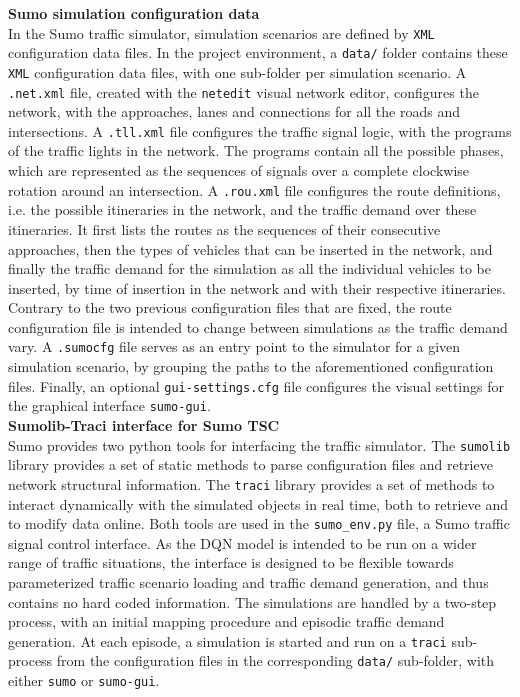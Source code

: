 \textbf{Sumo simulation configuration data} \\
In the Sumo traffic simulator, simulation scenarios are defined by \texttt{XML} configuration data files. In the project environment, a \texttt{data/} folder contains these \texttt{XML} configuration data files, with one sub-folder per simulation scenario. A \texttt{.net.xml} file, created with the \texttt{netedit} visual network editor, configures the network, with the approaches, lanes and connections for all the roads and intersections. A \texttt{.tll.xml} file configures the traffic signal logic, with the programs of the traffic lights in the network. The programs contain all the possible phases, which are represented as the sequences of signals over a complete clockwise rotation around an intersection. A \texttt{.rou.xml} file configures the route definitions, i.e. the possible itineraries in the network, and the traffic demand over these itineraries. It first lists the routes as the sequences of their consecutive approaches, then the types of vehicles that can be inserted in the network, and finally the traffic demand for the simulation as all the individual vehicles to be inserted, by time of insertion in the network and with their respective itineraries. Contrary to the two previous configuration files that are fixed, the route configuration file is intended to change between simulations as the traffic demand vary. A \texttt{.sumocfg} file serves as an entry point to the simulator for a given simulation scenario, by grouping the paths to the aforementioned configuration files. Finally, an optional \texttt{gui-settings.cfg} file configures the visual settings for the graphical interface \texttt{sumo-gui}. \\

\textbf{Sumolib-Traci interface for Sumo TSC} \\
Sumo provides two python tools for interfacing the traffic simulator. The \texttt{sumolib} library provides a set of static methods to parse configuration files and retrieve network structural information. The \texttt{traci} library provides a set of methods to interact dynamically with the simulated objects in real time, both to retrieve and to modify data online. Both tools are used in the \texttt{sumo\_env.py} file, a Sumo traffic signal control interface. As the DQN model is intended to be run on a wider range of traffic situations, the interface is designed to be flexible towards parameterized traffic scenario loading and traffic demand generation, and thus contains no hard coded information. The simulations are handled by a two-step process, with an initial mapping procedure and episodic traffic demand generation. At each episode, a simulation is started and run on a \texttt{traci} sub-process from the configuration files in the corresponding \texttt{data/} sub-folder, with either \texttt{sumo} or \texttt{sumo-gui}. \\ 

